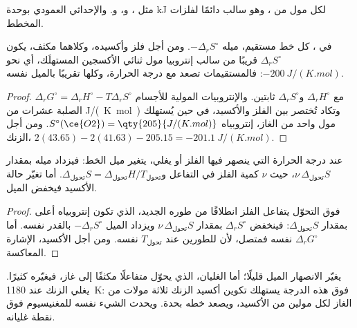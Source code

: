 مثل ، و، و. والإحداثي العمودي بوحدة \unit{kJ} لكل مول من ، وهو سالب دائمًا
لفلزات المخطط.

\begin{proposition}[المستقيمات]\label{prop:b2:ellingham:line}
في ، كل خط مستقيم، ميله $-\Delta_r
S^\circ$. ومن أجل فلز وأكسيده، وكلاهما مكثف، يكون $\Delta_r S^\circ$
قريبًا من سالب إنتروبيا مول ثنائي الأكسجين المستهلَك، أي نحو
$-\qty{200}{J/(K.mol)}$: فالمستقيمات تصعد مع درجة الحرارة، وكلها تقريبًا
بالميل نفسه.
\end{proposition}

\begin{proof}
$\Delta_r G^\circ = \Delta_r H^\circ - T\Delta_r S^\circ$ مع $\Delta_r
H^\circ$ و$\Delta_r S^\circ$ ثابتين. والإنتروبيات المولية للأجسام الصلبة عشرات من
\unit{J/(K.mol)} وتكاد تُختصر بين الفلز والأكسيد، في حين يُستهلك مول واحد من
الغاز، إنتروبياه $S^\circ(\ce{O2}) = \qty{205}{J/(K.mol)}$. ومن أجل الزنك،
$2(43.65) - 2(41.63) - 205.15 = \qty{-201.1}{J/(K.mol)}$.
\end{proof}

\begin{proposition}\label{prop:b2:ellingham:break}
عند درجة الحرارة التي ينصهر فيها الفلز أو يغلي، يتغير ميل الخط:
فيزداد ميله بمقدار $\nu\,\Delta_{\text{تحول}}S$، حيث $\nu$ كمية
الفلز في التفاعل و$\Delta_{\text{تحول}}S = \Delta_{\text{تحول}}H/T_{\text{تحول}}$.
أما تغيّر حالة الأكسيد فيخفض الميل.
\end{proposition}

\begin{proof}
فوق التحوّل يتفاعل الفلز انطلاقًا من طوره الجديد، الذي تكون إنتروبياه
أعلى بمقدار $\Delta_{\text{تحول}}S$: فينخفض $\Delta_r S^\circ$ بمقدار $\nu\,\Delta_{\text{تحول}}S$
ويزداد الميل $-\Delta_r S^\circ$ بالقدر نفسه. أما $\Delta_r G^\circ$
نفسه فمتصل، لأن للطورين عند $T_{\text{تحول}}$ 
نفسه. ومن أجل الأكسيد، الإشارة المعاكسة.
\end{proof}

يغيّر الانصهار الميل قليلًا؛ أما الغليان، الذي يحوّل متفاعلًا مكثفًا
إلى غاز، فيغيّره كثيرًا. يغلي الزنك عند \qty{1180}{K}: فوق هذه
الدرجة يستهلك تكوين أكسيد الزنك ثلاثة مولات من الغاز لكل مولين من
الأكسيد، ويصعد خطه بحدة. ويحدث الشيء نفسه للمغنيسيوم فوق
نقطة غليانه.

